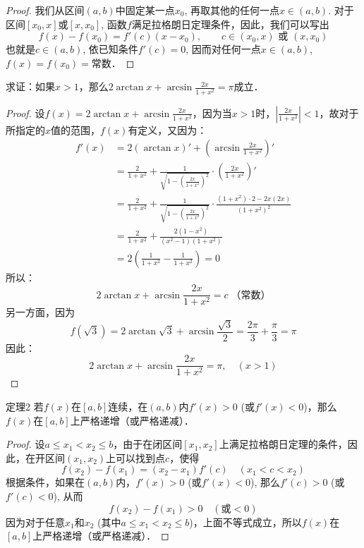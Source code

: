\begin{proof}
  我们从区间$(a,b)$中固定某一点$x_0$, 再取其他的任何一点$x\in (a,b)$. 对于区间$[x_0,x]$或$[x,x_0]$, 函数$f$满足拉格朗日定理条件，因此，我们可以写出
  \[f (x) -f (x_0) =f' (c) (x-x_0),\qquad c\in (x_0,x)\text{ 或 }(x,x_0)\]
  也就是$c\in (a,b)$, 依已知条件$f'(c)=0$, 因而对任何一点$x\in (a,b)$, $f(x)=f(x_0)=$常数．  
\end{proof}



\begin{example}
    求证：如果$x>1$，那么$2\arctan x+\arcsin\frac{2x}{1+x^2}=\pi$成立．
\end{example}

\begin{proof}
设$f(x)=2\arctan x+\arcsin\frac{2x}{1+x^2}$，因为当$x>1$时，$\left|\frac{2x}{1+x^2}\right|<1$，故对于所指定的$x$值的范围，$f(x)$有定义，又因为：
\begin{align*}
    f'(x)&=2(\arctan x)'+\left(\arcsin\frac{2x}{1+x^2}\right)'\\
    &=\frac{2}{1+x^2}+\frac{1}{\sqrt{1-\left(\frac{2x}{1+x^2}\right)^2}}\cdot \left(\frac{2x}{1+x^2}\right)'\\
    &=\frac{2}{1+x^2}+\frac{1}{\sqrt{1-\left(\frac{2x}{1+x^2}\right)^2}}\cdot \frac{(1+x^2)\cdot 2-2x(2x)}{(1+x^2)^2}\\
    &=\frac{2}{1+x^2}+\frac{2(1-x^2)}{(x^2-1)(1+x^2)}\\
    &=2\left(\frac{1}{1+x^2}-\frac{1}{1+x^2}\right)=0
\end{align*}
所以：
\[2\arctan x+\arcsin\frac{2x}{1+x^2}=c\; \text{（常数）}\]
另一方面，因为
\[f\left(\sqrt{3}\right)=2\arctan\sqrt{3}+\arcsin\frac{\sqrt{3}}{2}=\frac{2\pi}{3}+\frac{\pi}{3}=\pi\]
因此：
\[2\arctan x+\arcsin\frac{2x}{1+x^2}=\pi,\quad (x>1)\]
\end{proof}


\begin{blk}
    {定理2} 若$f(x)$在$[a,b]$连续，在$(a,b)$内$f'(x)>0$ (或$f'(x)<0$)，那么$f(x)$在$[a,b]$上严格递增（或严格递减）．
\end{blk}


\begin{proof}
    设$a\le x_1<x_2\le b$，由于在闭区间$[x_1,x_2]$上满足拉格朗日定理的条件，因此，在开区间$(x_1,x_2)$上可以找到点$c$，使得
\[f(x_2)-f(x_1)=(x_2-x_1)f'(c)\quad (x_1<c<x_2)\]
根据条件，如果在$(a,b)$内，$f'(x)>0$ (或$f'(x)<0$), 那么$f'(c)>0$ (或$f'(c)<0$), 从而
\[f(x_2)-f(x_1)>0\quad (\text{或}<0)\]
因为对于任意$x_1$和$x_2$ (其中$a\le x_1<x_2\le b$)，上面不等式成立，所以$f(x)$在$[a,b]$上严格递增（或严格递减）．
\end{proof}

